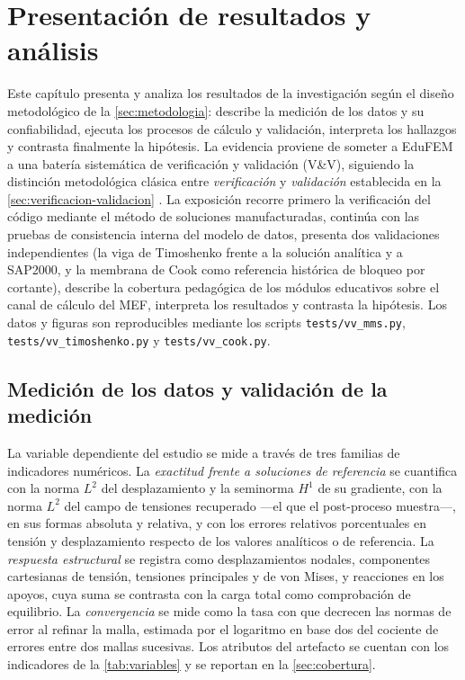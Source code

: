 \chapter{Presentación de resultados y análisis}
\label{cap:resultados}


Este capítulo presenta y analiza los resultados de la investigación según el diseño metodológico de la \autoref{sec:metodologia}: describe la medición de los datos y su confiabilidad, ejecuta los procesos de cálculo y validación, interpreta los hallazgos y contrasta finalmente la hipótesis. La evidencia proviene de someter a EduFEM a una batería sistemática de verificación y validación (V\&V), siguiendo la distinción metodológica clásica entre \emph{verificación} y \emph{validación} establecida en la \autoref{sec:verificacion-validacion} \autocite[pp.~13-14]{oberkampf2010vv}. La exposición recorre primero la verificación del código mediante el método de soluciones manufacturadas, continúa con las pruebas de consistencia interna del modelo de datos, presenta dos validaciones independientes (la viga de Timoshenko frente a la solución analítica y a SAP2000, y la membrana de Cook como referencia histórica de bloqueo por cortante), describe la cobertura pedagógica de los módulos educativos sobre el canal de cálculo del MEF, interpreta los resultados y contrasta la hipótesis. Los datos y figuras son reproducibles mediante los scripts \texttt{tests/vv\_mms.py}, \texttt{tests/vv\_timoshenko.py} y \texttt{tests/vv\_cook.py}.

\section{Medición de los datos y validación de la medición}
\label{sec:medicion}

La variable dependiente del estudio se mide a través de tres familias de indicadores numéricos. La \emph{exactitud frente a soluciones de referencia} se cuantifica con la norma $L^2$ del desplazamiento y la seminorma $H^1$ de su gradiente, con la norma $L^2$ del campo de tensiones recuperado —el que el post-proceso muestra—, en sus formas absoluta y relativa, y con los errores relativos porcentuales en tensión y desplazamiento respecto de los valores analíticos o de referencia. La \emph{respuesta estructural} se registra como desplazamientos nodales, componentes cartesianas de tensión, tensiones principales y de von Mises, y reacciones en los apoyos, cuya suma se contrasta con la carga total como comprobación de equilibrio. La \emph{convergencia} se mide como la tasa con que decrecen las normas de error al refinar la malla, estimada por el logaritmo en base dos del cociente de errores entre dos mallas sucesivas. Los atributos del artefacto se cuentan con los indicadores de la \autoref{tab:variables} y se reportan en la \autoref{sec:cobertura}.

